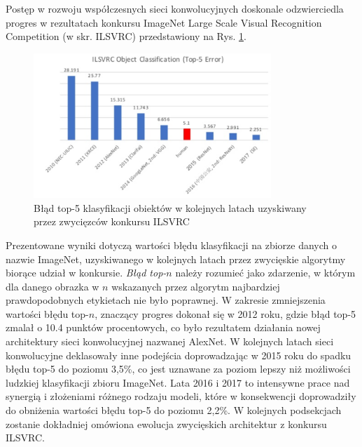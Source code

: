 Postęp w rozwoju współczesnych sieci konwolucyjnych doskonale odzwierciedla progres w rezultatach konkursu ImageNet Large Scale Visual Recognition Competition (w skr. ILSVRC) przedstawiony na Rys. \ref{ILSVRC}.
\begin{figure}[h!]
	\centering
	\includegraphics[width=0.8\textwidth]{figures/ILSVRC.png}
	\caption{Błąd top-5 klasyfikacji obiektów w kolejnych latach uzyskiwany przez zwycięzców konkursu ILSVRC}
	\label{ILSVRC}
\end{figure}
Prezentowane wyniki dotyczą wartości błędu klasyfikacji na zbiorze danych \cite{imagenet_cvpr09} o nazwie ImageNet, uzyskiwanego w kolejnych latach przez zwycięskie algorytmy biorące udział w konkursie. \textit{Błąd top-$n$} należy rozumieć jako zdarzenie, w którym dla danego obrazka w $n$ wskazanych przez algorytm najbardziej prawdopodobnych etykietach nie było poprawnej. W zakresie zmniejszenia wartości błędu top-$n$, znaczący progres dokonał się w 2012 roku, gdzie błąd top-5 zmalał o 10.4 punktów procentowych, co było rezultatem działania nowej architektury sieci konwolucyjnej nazwanej AlexNet. W kolejnych latach sieci konwolucyjne deklasowały inne podejścia doprowadzając w 2015 roku do spadku błędu top-5 do poziomu 3,5\%, co jest uznawane za poziom lepszy niż możliwości ludzkiej klasyfikacji zbioru ImageNet. Lata 2016 i 2017 to intensywne prace nad synergią i złożeniami różnego rodzaju modeli, które w konsekwencji doprowadziły do obniżenia wartości błędu top-5 do poziomu 2,2\%. W kolejnych podsekcjach zostanie dokładniej omówiona ewolucja zwycięskich architektur z konkursu ILSVRC. 

